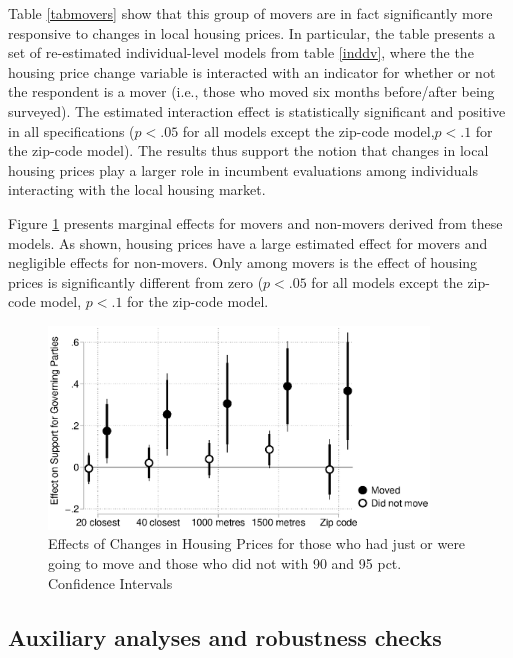\documentclass[12pt,a4paper]{article}
\begin{document}
	Table \ref{tabmovers} show that this group of movers are in fact significantly more responsive to changes in local housing prices. In particular, the table presents a set of re-estimated individual-level models from table \ref{inddv}, where the the housing price change variable is interacted with an indicator for whether or not the respondent is a mover (i.e., those who moved six months before/after being surveyed). The estimated interaction effect is statistically significant and positive in all specifications ($p<.05$ for all models except the zip-code model,$p<.1$ for the zip-code model). The results thus support the notion that  changes in local housing prices play a larger role in incumbent evaluations among individuals interacting with the local housing market.
	
	Figure \ref{move} presents marginal effects for movers and non-movers derived from these models. As shown, housing prices have a large estimated effect for movers and negligible effects for non-movers.  Only among movers is the effect of housing prices is significantly different from zero ($p<.05$ for all models except the zip-code model, $p<.1$ for the zip-code model.
	
	
	
	\begin{figure}[htbp!]
		\includegraphics[width=0.9\textwidth]{../figures/moving.eps}
		\centering
		\caption{Effects of Changes in Housing Prices for those who had just or were going to move and those who did not with 90 and 95 pct. Confidence Intervals}\label{move}
	\end{figure}
	
	
	\subsection{Auxiliary analyses and robustness checks}
	
\end{document}

